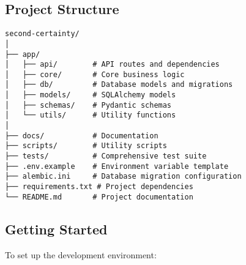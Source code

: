 \documentclass[
  11pt,
  letterpaper,
]{article}
\begin{document}
\hypertarget{project-structure}{%
\subsection{Project Structure}\label{project-structure}}

\begin{verbatim}
second-certainty/
│
├── app/
│   ├── api/        # API routes and dependencies
│   ├── core/       # Core business logic
│   ├── db/         # Database models and migrations
│   ├── models/     # SQLAlchemy models
│   ├── schemas/    # Pydantic schemas
│   └── utils/      # Utility functions
│
├── docs/           # Documentation
├── scripts/        # Utility scripts
├── tests/          # Comprehensive test suite
├── .env.example    # Environment variable template
├── alembic.ini     # Database migration configuration
├── requirements.txt # Project dependencies
└── README.md       # Project documentation
\end{verbatim}

\hypertarget{getting-started}{%
\subsection{Getting Started}\label{getting-started}}

To set up the development environment:
\end{document}
